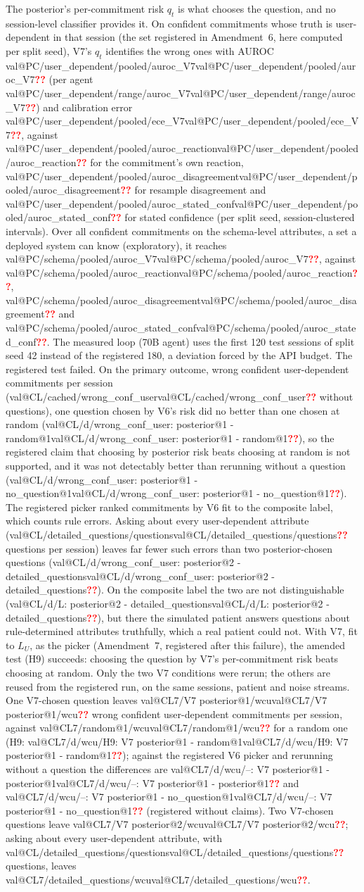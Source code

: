 \documentclass[10pt,a4paper,twocolumn]{article}
\makeatletter
\newcommand{\val}[1]{\ifcsname val@#1\endcsname\csname val@#1\endcsname\else\textcolor{red}{\textbf{??}}\fi}
\newif\iffinal \finaltrue
\newcommand{\chk}[1]{\iffinal#1\else\textcolor{blue}{#1}\fi}
\newcommand{\LU}{L_{U}}
\makeatother
\begin{document}
The posterior's per-commitment risk $q_t$ is what chooses the question,
and no session-level classifier provides it. On confident commitments whose
truth is user-dependent in that session (the set registered in
Amendment~6, here computed per split seed), V7's $q_t$ identifies the wrong ones with AUROC
\val{PC/user_dependent/pooled/auroc_V7} (per agent
\val{PC/user_dependent/range/auroc_V7}) and calibration error
\val{PC/user_dependent/pooled/ece_V7}, against
\val{PC/user_dependent/pooled/auroc_reaction} for the commitment's own
reaction, \val{PC/user_dependent/pooled/auroc_disagreement} for resample
disagreement and \val{PC/user_dependent/pooled/auroc_stated_conf} for stated
confidence (per split seed, session-clustered intervals). Over all confident
commitments on the schema-level attributes, a set a deployed system can know
(exploratory), it reaches \val{PC/schema/pooled/auroc_V7}, against
\val{PC/schema/pooled/auroc_reaction}, \val{PC/schema/pooled/auroc_disagreement}
and \val{PC/schema/pooled/auroc_stated_conf}. The measured loop (70B agent)
uses the first 120 test sessions of split seed 42 instead of the registered
180, a deviation forced by the API budget.
\chk{The registered test failed. On the primary outcome, wrong confident
user-dependent commitments per session (\val{CL/cached/wrong_conf_user}
without questions), one question chosen by V6's risk did no better than one
chosen at random (\val{CL/d/wrong_conf_user: posterior@1 - random@1}), so the
registered claim that choosing by posterior risk beats choosing at random is
not supported, and it was not detectably better than rerunning without a
question (\val{CL/d/wrong_conf_user: posterior@1 - no_question@1}). The
registered picker ranked commitments by V6 fit to the composite label, which
counts rule errors. Asking about every user-dependent attribute
(\val{CL/detailed_questions/questions} questions per session) leaves far
fewer such errors than two posterior-chosen questions
(\val{CL/d/wrong_conf_user: posterior@2 - detailed_questions}). On the
composite label the two are not distinguishable
(\val{CL/d/L: posterior@2 - detailed_questions}), but there the simulated
patient answers questions about rule-determined attributes truthfully,
which a real patient could not.}
\chk{With V7, fit to $\LU$, as the picker (Amendment~7, registered after
this failure), the amended test (H9) succeeds: choosing the question by V7's
per-commitment risk beats choosing at random. Only the two V7 conditions
were rerun; the others are reused from the registered run, on the same
sessions, patient and noise streams. One V7-chosen question leaves
\val{CL7/V7 posterior@1/wcu} wrong confident user-dependent commitments per
session, against \val{CL7/random@1/wcu} for a random one (H9:
\val{CL7/d/wcu/H9: V7 posterior@1 - random@1}); against the registered V6
picker and rerunning without a question the differences are
\val{CL7/d/wcu/--: V7 posterior@1 - posterior@1} and
\val{CL7/d/wcu/--: V7 posterior@1 - no_question@1} (registered without
claims). Two
V7-chosen questions leave \val{CL7/V7 posterior@2/wcu}; asking about every
user-dependent attribute, with \val{CL/detailed_questions/questions}
questions, leaves \val{CL7/detailed_questions/wcu}.}
\end{document}
